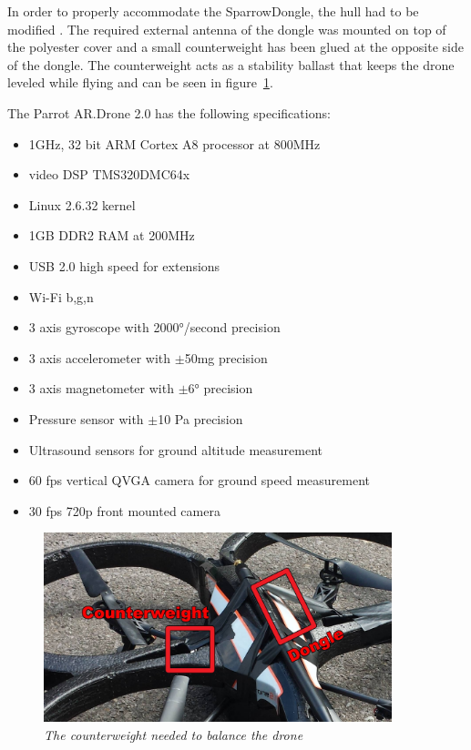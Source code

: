 In order to properly accommodate the SparrowDongle, the hull had to be modified . The required external antenna of the dongle was mounted on top of the polyester cover and a small counterweight has been glued at the opposite side of the dongle. The counterweight acts as a stability ballast that keeps the drone leveled while flying and can be seen in figure~\ref{fig:counterweight}.

The Parrot AR.Drone 2.0 has the following specifications:
\begin{itemize}
\item   1GHz, 32 bit ARM Cortex A8 processor at 800MHz
\item   video DSP TMS320DMC64x
\item   Linux 2.6.32 kernel
\item   1GB DDR2 RAM at 200MHz
\item   USB 2.0 high speed for extensions
\item   Wi-Fi b,g,n
\item   3 axis gyroscope with 2000°/second precision
\item   3 axis accelerometer with $\pm$50mg precision
\item   3 axis magnetometer with $\pm$6° precision
\item   Pressure sensor with $\pm$10 Pa precision
\item   Ultrasound sensors for ground altitude measurement
\item   60 fps vertical QVGA camera for ground speed measurement
\item	30 fps 720p front mounted camera 	
\end{itemize}

\begin{figure}[ht]
\begin{center}
\includegraphics[width=0.9\textwidth]{img/counterweight.png}
\end{center}
\caption{\small \itshape{The counterweight needed to balance the drone}}
  \label{fig:counterweight}
\end{figure}


